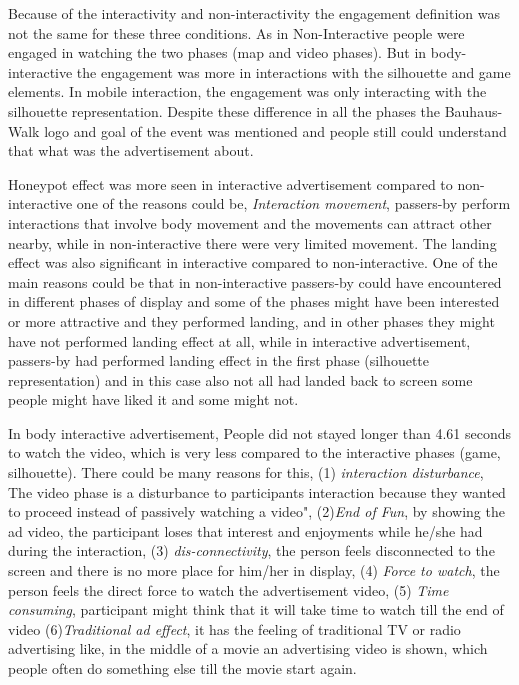 Because of the interactivity and non-interactivity the engagement definition was not the same for these three conditions. As in Non-Interactive people were engaged in watching the two phases (map and video phases). But in body-interactive the engagement was more in interactions with the silhouette and game elements. In mobile interaction, the engagement was only interacting with the silhouette representation. Despite these difference in all the phases the Bauhaus-Walk logo and goal of the event was mentioned and people still could understand that what was the advertisement about.

Honeypot effect was more seen in interactive advertisement compared to non-interactive one of the reasons could be, \emph{Interaction movement}, passers-by perform interactions that involve body movement and the movements can attract other nearby, while in non-interactive there were very limited movement. The landing effect was also significant in interactive compared to non-interactive. One of the main reasons could be that in non-interactive passers-by could have encountered in different phases of display and some of the phases might have been interested or more attractive and they performed landing, and in other phases they might have not performed landing effect at all, while in interactive advertisement, passers-by had performed landing effect in the first phase (silhouette representation) and in this case also not all had landed back to screen some people might have liked it and some might not.

In body interactive advertisement, People did not stayed longer than 4.61 seconds to watch the video, which is very less compared to the interactive phases (game, silhouette). There could be many reasons for this, (1) \emph{interaction disturbance}, The video phase is a disturbance to participants interaction because they wanted to proceed instead of passively watching a video", (2)\emph{End of Fun}, by showing the ad video, the participant loses that interest and enjoyments while he/she had during the interaction, (3) \emph{dis-connectivity}, the person feels disconnected to the screen and there is no more place for him/her in display, (4) \emph{Force to watch}, the person feels the direct force to watch the advertisement video, (5) \emph{Time consuming}, participant might think that it will take time to watch till the end of video  (6)\emph{Traditional ad effect}, it has the feeling of traditional TV or radio advertising like, in the middle of a movie an advertising video is shown, which people often do something else till the movie start again.



